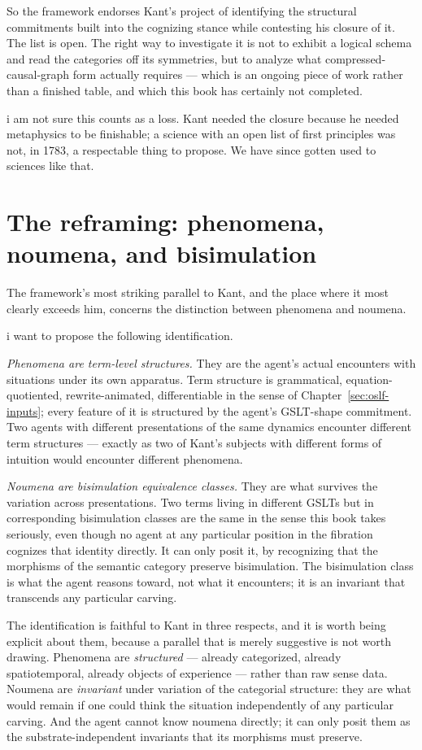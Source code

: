 So the framework endorses Kant's project of identifying the
structural commitments built into the cognizing stance while
contesting his closure of it.
The list is open.
The right way to investigate it is not to exhibit a logical schema
and read the categories off its symmetries, but to analyze what
compressed-causal-graph form actually requires --- which is an
ongoing piece of work rather than a finished table, and which this
book has certainly not completed.

i am not sure this counts as a loss.
Kant needed the closure because he needed metaphysics to be
finishable; a science with an open list of first principles was not,
in 1783, a respectable thing to propose.
We have since gotten used to sciences like that.

\section{The reframing: phenomena, noumena, and bisimulation}
\label{sec:kant-noumena}

The framework's most striking parallel to Kant, and the place where
it most clearly exceeds him, concerns the distinction between
phenomena and noumena.

i want to propose the following identification.

\emph{Phenomena are term-level structures.}
They are the agent's actual encounters with situations under its
own apparatus.
Term structure is grammatical, equation-quotiented,
rewrite-animated, differentiable in the sense of
Chapter~\ref{sec:oslf-inputs}; every feature of it is structured by
the agent's GSLT-shape commitment.
Two agents with different presentations of the same dynamics
encounter different term structures --- exactly as two of Kant's
subjects with different forms of intuition would encounter
different phenomena.

\emph{Noumena are bisimulation equivalence classes.}
They are what survives the variation across presentations.
Two terms living in different GSLTs but in corresponding
bisimulation classes are the same in the sense this book takes
seriously, even though no agent at any particular position in the
fibration cognizes that identity directly.
It can only posit it, by recognizing that the morphisms of the
semantic category preserve bisimulation.
The bisimulation class is what the agent reasons toward, not what
it encounters; it is an invariant that transcends any particular
carving.

The identification is faithful to Kant in three respects, and it is
worth being explicit about them, because a parallel that is merely
suggestive is not worth drawing.
Phenomena are \emph{structured} --- already categorized, already
spatiotemporal, already objects of experience --- rather than raw
sense data.
Noumena are \emph{invariant} under variation of the categorial
structure: they are what would remain if one could think the
situation independently of any particular carving.
And the agent cannot know noumena directly; it can only posit them
as the substrate-independent invariants that its morphisms must
preserve.

